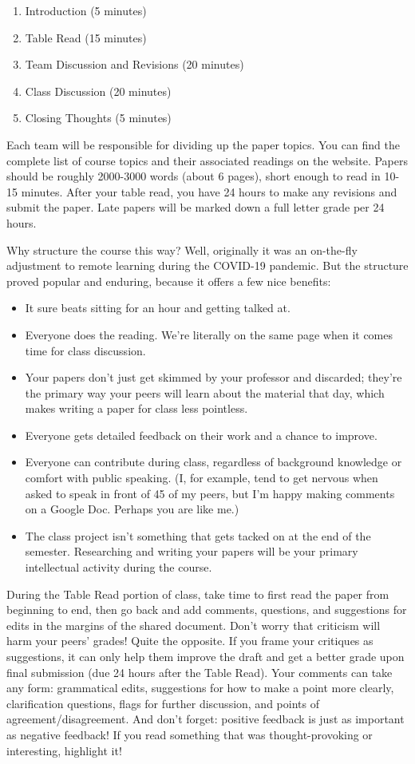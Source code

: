 \documentclass[11pt, letterpaper]{article}
\begin{document}
\begin{enumerate}
\item Introduction (5 minutes)
\item Table Read (15 minutes)
\item Team Discussion and Revisions (20 minutes)
\item Class Discussion (20 minutes)
\item Closing Thoughts (5 minutes)
\end{enumerate}

Each team will be responsible for dividing up the paper topics. You can find the complete list of course topics and their associated readings on the website. Papers should be roughly 2000-3000 words (about 6 pages), short enough to read in 10-15 minutes. After your table read, you have 24 hours to make any revisions and submit the paper. Late papers will be marked down a full letter grade per 24 hours.
 
Why structure the course this way? Well, originally it was an on-the-fly adjustment to remote learning during the COVID-19 pandemic. But the structure proved popular and enduring, because it offers a few nice benefits:

\begin{itemize}
	\item It sure beats sitting for an hour and getting talked at.
	\item Everyone does the reading. We're literally on the same page when it comes time for class discussion.
	\item Your papers don't just get skimmed by your professor and discarded; they're the primary way your peers will learn about the material that day, which makes writing a paper for class less pointless.
	\item Everyone gets detailed feedback on their work and a chance to improve.
	\item Everyone can contribute during class, regardless of background knowledge or comfort with public speaking. (I, for example, tend to get nervous when asked to speak in front of 45 of my peers, but I’m happy making comments on a Google Doc. Perhaps you are like me.)
	\item The class project isn't something that gets tacked on at the end of the semester. Researching and writing your papers will be your primary intellectual activity during the course.
\end{itemize}

\noindent During the Table Read portion of class, take time to first read the paper from beginning to end, then go back and add comments, questions, and suggestions for edits in the margins of the shared document. Don't worry that criticism will harm your peers' grades! Quite the opposite. If you frame your critiques as suggestions, it can only help them improve the draft and get a better grade upon final submission (due 24 hours after the Table Read). Your comments can take any form: grammatical edits, suggestions for how to make a point more clearly, clarification questions, flags for further discussion, and points of agreement/disagreement. And don't forget: positive feedback is just as important as negative feedback! If you read something that was thought-provoking or interesting, highlight it!
\end{document}
